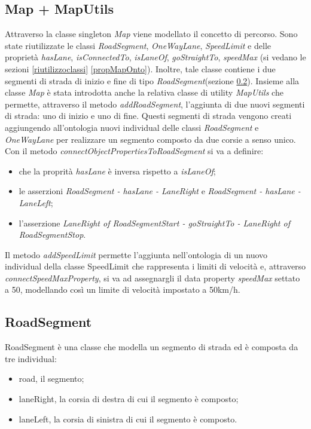 \subsection{Map + MapUtils}
Attraverso la classe singleton \textit{Map} viene modellato il concetto di percorso.
Sono state riutilizzate le classi \textit{RoadSegment}, \textit{OneWayLane}, \textit{SpeedLimit} e delle propriet\`a \textit{hasLane}, \textit{isConnectedTo}, \textit{isLaneOf}, \textit{goStraightTo}, \textit{speedMax} (si vedano le sezioni \ref{riutilizzoclassi} \ref{propMapOnto}).
Inoltre, tale classe contiene i due segmenti di strada di inizio e fine di tipo \textit{RoadSegment}(sezione \ref{roadsegment}).
Insieme alla classe \textit{Map} \`e stata introdotta anche la relativa classe di utility \textit{MapUtils} che permette, attraverso il metodo \textit{addRoadSegment}, l'aggiunta di due nuovi segmenti di strada: uno di inizio e uno di fine.
Questi segmenti di strada vengono creati aggiungendo all'ontologia nuovi individual delle classi \textit{RoadSegment} e \textit{OneWayLane} per realizzare un segmento composto da due corsie a senso unico.
Con il metodo \textit{connectObjectPropertiesToRoadSegment} si va a definire:
\begin{itemize}
\item che la proprit\`a \textit{hasLane} \`e inversa rispetto a \textit{isLaneOf};
\item le asserzioni \textit{RoadSegment - hasLane - LaneRight} e \textit{RoadSegment - hasLane - LaneLeft};
\item l'asserzione \textit{LaneRight of RoadSegmentStart - goStraightTo - LaneRight of RoadSegmentStop}.
\end{itemize}
Il metodo \textit{addSpeedLimit} permette l'aggiunta nell'ontologia di un nuovo individual della classe SpeedLimit che rappresenta i limiti di velocit\`a e, attraverso \textit{connectSpeedMaxProperty}, si va ad assegnargli il data property \textit{speedMax} settato a 50, modellando cos\`i un limite di velocit\`a impostato a 50km/h.
\subsection{RoadSegment}\label{roadsegment}
RoadSegment \`e una classe che modella un segmento di strada ed \`e composta da tre individual:
\begin{itemize}
\item road, il segmento;
\item laneRight, la corsia di destra di cui il segmento \`e composto;
\item laneLeft, la corsia di sinistra di cui il segmento \`e composto.
\end{itemize}
